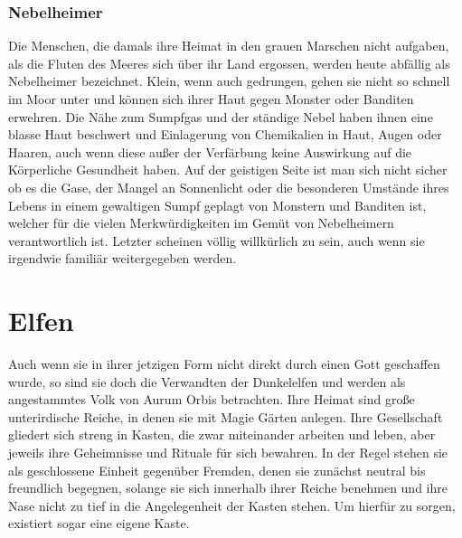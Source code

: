 \documentclass[a4paper,12pt,oneside]{book}
\begin{document}
\subsubsection{Nebelheimer}
Die Menschen, die damals ihre Heimat in den grauen Marschen nicht aufgaben, als die Fluten des Meeres sich über ihr Land ergossen, werden heute abfällig als Nebelheimer bezeichnet. Klein, wenn auch gedrungen, gehen sie nicht so schnell im Moor unter und können sich ihrer Haut gegen Monster oder Banditen erwehren. Die Nähe zum Sumpfgas und der ständige Nebel haben ihnen eine blasse Haut beschwert und Einlagerung von Chemikalien in Haut, Augen oder Haaren, auch wenn diese außer der Verfärbung keine Auswirkung auf die Körperliche Gesundheit haben. Auf der geistigen Seite ist man sich nicht sicher ob es die Gase, der Mangel an Sonnenlicht oder die besonderen Umstände ihres Lebens in einem gewaltigen Sumpf geplagt von Monstern und Banditen ist, welcher für die vielen Merkwürdigkeiten im Gemüt von Nebelheimern verantwortlich ist. Letzter scheinen völlig willkürlich zu sein, auch wenn sie irgendwie familiär weitergegeben werden.

\section{Elfen}\label{Elfen}
Auch wenn sie in ihrer jetzigen Form nicht direkt durch einen Gott geschaffen wurde, so sind sie doch die Verwandten der Dunkelelfen und werden als angestammtes Volk von Aurum Orbis betrachten. Ihre Heimat sind große unterirdische Reiche, in denen sie mit Magie Gärten anlegen. Ihre Gesellschaft gliedert sich streng in Kasten, die zwar miteinander arbeiten und leben, aber jeweils ihre Geheimnisse und Rituale für sich bewahren. In der Regel stehen sie als geschlossene Einheit gegenüber Fremden, denen sie zunächst neutral bis freundlich begegnen, solange sie sich innerhalb ihrer Reiche benehmen und ihre Nase nicht zu tief in die Angelegenheit der Kasten stehen. Um hierfür zu sorgen, existiert sogar eine eigene Kaste.
\end{document}
